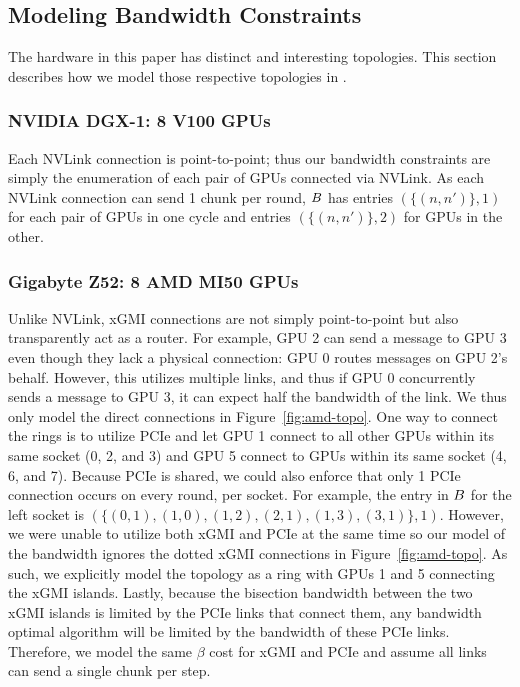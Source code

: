\subsection{Modeling Bandwidth Constraints}
The hardware in this paper has distinct and interesting
topologies. This section describes how we model those respective
topologies in \tool.

\subsubsection{NVIDIA DGX-1: 8 V100 GPUs}
Each NVLink connection is point-to-point; thus our bandwidth constraints are simply
the enumeration of each pair of GPUs connected via NVLink. As each NVLink
connection can send 1 chunk per round, $B$ has entries $(\{(n,n')\},1)$ for each
pair of GPUs in one cycle and entries $(\{(n,n')\},2)$ for GPUs in the other.

\subsubsection{Gigabyte Z52: 8 AMD MI50 GPUs}
Unlike NVLink, xGMI connections are not simply point-to-point but also
transparently act as a router.  For example, GPU 2 can send a message
to GPU 3 even though they lack a physical connection: GPU 0 routes
messages on GPU 2's behalf.  However, this utilizes multiple links,
and thus if GPU 0 concurrently sends a message to GPU 3, it can expect
half the bandwidth of the link.  We thus only model the direct
connections in Figure~\ref{fig:amd-topo}.  One way to connect the
rings is to utilize PCIe and let GPU 1 connect to all other GPUs
within its same socket (0, 2, and 3) and GPU 5 connect to GPUs within
its same socket (4, 6, and 7).  Because PCIe is shared, we could also
enforce that only 1 PCIe connection occurs on every round, per socket.
%
For example, the entry in $B$ for the left socket is $(\{(0,1),(1,0),(1,2),(2,1),(1,3),(3,1)\},1)$.
%
However, we were unable to utilize both xGMI and PCIe at the same time
so our model of the bandwidth ignores the dotted xGMI connections in
Figure~\ref{fig:amd-topo}.  As such, we explicitly model the topology as a ring with GPUs 1 and 5 connecting the xGMI islands. Lastly, because the bisection bandwidth between the two xGMI islands is limited by the
PCIe links that connect them, any bandwidth optimal algorithm will be limited by the bandwidth of these PCIe links. Therefore, we model the same $\beta$ cost
for xGMI and PCIe and assume all
links can send a single chunk per step.


